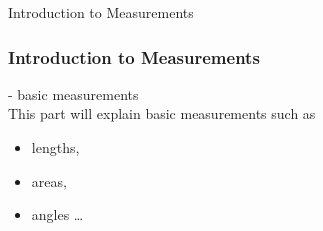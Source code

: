 \begin{omgroup}{Introduction to Measurements}
\begin{frame}
  \frametitle{Introduction to Measurements}
  \begin{module}[id=intromeasurements]
  - basic measurements\\
  This part will explain basic measurements such as
  \begin{itemize}
    \item lengths,
    \item areas,
    \item angles \ldots
  \end{itemize}
  \end{module}
\end{frame}
\end{omgroup}
